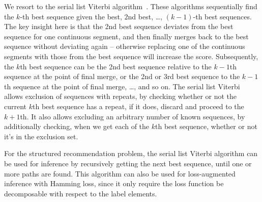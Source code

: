 We resort to the serial list Viterbi algorithm~\cite{seshadri1994list,nilsson2001sequentially}.
These algorithms sequentially find the $k$-th best sequence given the best, $2$nd best, \dots, $(k-1)$-th best sequences.
The key insight here is that the 2nd best sequence deviates from the best sequence
for one continuous segment, and then finally merges back to the best sequence without deviating again
-- otherwise replacing one of the continuous segments with those from the best sequence will increase the score.
Subsequently, the $k$th best sequence can be the 2nd best sequence relative to the $k-1$th sequence
at the point of final merge, or the 2nd or 3rd best sequence to the $k-1$th sequence at the point of final merge, \ldots, and so on.
The serial list Viterbi allows exclusion of sequences with repeats, by checking whether or not the current $k$th best sequence has a repeat, if it does, discard and proceed to the $k+1$th. It also allows excluding an arbitrary number of known sequences, by additionally checking, when we get each of the $k$th best sequence, whether or not it's in the exclusion set.

For the structured recommendation problem, the serial list Viterbi algorithm can be used for inference
by recursively getting the next best sequence, until one or more paths are found.
This algorithm can also be used for loss-augmented inference with Hamming loss,
since it only require the loss function be decomposable with respect to the label elements.

